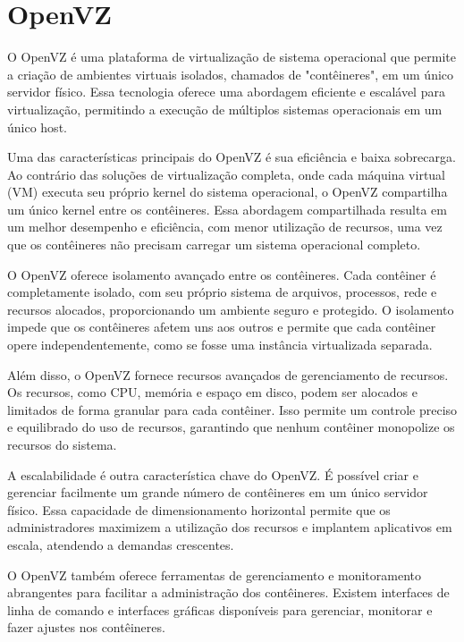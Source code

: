 \section{OpenVZ}

O OpenVZ é uma plataforma de virtualização de sistema operacional que permite a criação de ambientes virtuais isolados, chamados de "contêineres", em um único servidor físico. Essa tecnologia oferece uma abordagem eficiente e escalável para virtualização, permitindo a execução de múltiplos sistemas operacionais em um único host.

Uma das características principais do OpenVZ é sua eficiência e baixa sobrecarga. Ao contrário das soluções de virtualização completa, onde cada máquina virtual (VM) executa seu próprio kernel do sistema operacional, o OpenVZ compartilha um único kernel entre os contêineres. Essa abordagem compartilhada resulta em um melhor desempenho e eficiência, com menor utilização de recursos, uma vez que os contêineres não precisam carregar um sistema operacional completo.

O OpenVZ oferece isolamento avançado entre os contêineres. Cada contêiner é completamente isolado, com seu próprio sistema de arquivos, processos, rede e recursos alocados, proporcionando um ambiente seguro e protegido. O isolamento impede que os contêineres afetem uns aos outros e permite que cada contêiner opere independentemente, como se fosse uma instância virtualizada separada.

Além disso, o OpenVZ fornece recursos avançados de gerenciamento de recursos. Os recursos, como CPU, memória e espaço em disco, podem ser alocados e limitados de forma granular para cada contêiner. Isso permite um controle preciso e equilibrado do uso de recursos, garantindo que nenhum contêiner monopolize os recursos do sistema.

A escalabilidade é outra característica chave do OpenVZ. É possível criar e gerenciar facilmente um grande número de contêineres em um único servidor físico. Essa capacidade de dimensionamento horizontal permite que os administradores maximizem a utilização dos recursos e implantem aplicativos em escala, atendendo a demandas crescentes.

O OpenVZ também oferece ferramentas de gerenciamento e monitoramento abrangentes para facilitar a administração dos contêineres. Existem interfaces de linha de comando e interfaces gráficas disponíveis para gerenciar, monitorar e fazer ajustes nos contêineres.